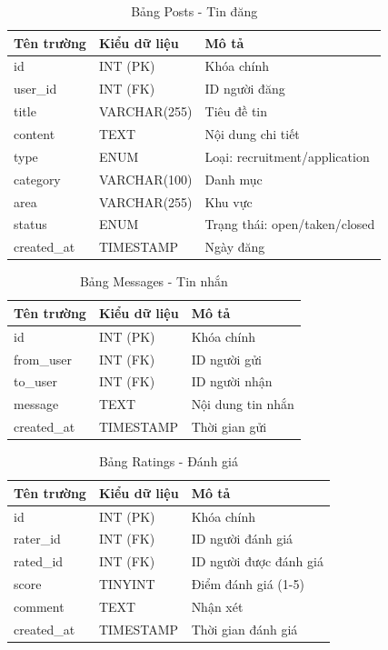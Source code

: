 \documentclass[13pt,a4paper]{extreport}
\begin{document}
\begin{table}[H]
\centering
\caption{Bảng Posts - Tin đăng}
\begin{tabular}{|l|l|l|}
\hline
\textbf{Tên trường} & \textbf{Kiểu dữ liệu} & \textbf{Mô tả} \\
\hline
id & INT (PK) & Khóa chính \\
user\_id & INT (FK) & ID người đăng \\
title & VARCHAR(255) & Tiêu đề tin \\
content & TEXT & Nội dung chi tiết \\
type & ENUM & Loại: recruitment/application \\
category & VARCHAR(100) & Danh mục \\
area & VARCHAR(255) & Khu vực \\
status & ENUM & Trạng thái: open/taken/closed \\
created\_at & TIMESTAMP & Ngày đăng \\
\hline
\end{tabular}
\end{table}

\begin{table}[H]
\centering
\caption{Bảng Messages - Tin nhắn}
\begin{tabular}{|l|l|l|}
\hline
\textbf{Tên trường} & \textbf{Kiểu dữ liệu} & \textbf{Mô tả} \\
\hline
id & INT (PK) & Khóa chính \\
from\_user & INT (FK) & ID người gửi \\
to\_user & INT (FK) & ID người nhận \\
message & TEXT & Nội dung tin nhắn \\
created\_at & TIMESTAMP & Thời gian gửi \\
\hline
\end{tabular}
\end{table}

\begin{table}[H]
\centering
\caption{Bảng Ratings - Đánh giá}
\begin{tabular}{|l|l|l|}
\hline
\textbf{Tên trường} & \textbf{Kiểu dữ liệu} & \textbf{Mô tả} \\
\hline
id & INT (PK) & Khóa chính \\
rater\_id & INT (FK) & ID người đánh giá \\
rated\_id & INT (FK) & ID người được đánh giá \\
score & TINYINT & Điểm đánh giá (1-5) \\
comment & TEXT & Nhận xét \\
created\_at & TIMESTAMP & Thời gian đánh giá \\
\hline
\end{tabular}
\end{table}
\end{document}
